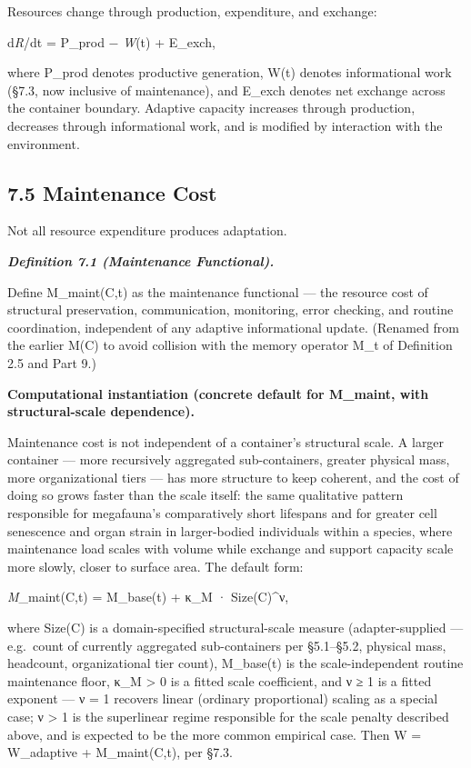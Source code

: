 \documentclass[
]{article}
\begin{document}
Resources change through production, expenditure, and exchange:

d\emph{R}/dt = P\_prod − \emph{W}(t) + E\_exch,

where P\_prod denotes productive generation, W(t) denotes informational
work (§7.3, now inclusive of maintenance), and E\_exch denotes net
exchange across the container boundary. Adaptive capacity increases
through production, decreases through informational work, and is
modified by interaction with the environment.

\hypertarget{maintenance-cost}{%
\subsection{7.5 Maintenance Cost}\label{maintenance-cost}}

Not all resource expenditure produces adaptation.

\emph{\textbf{Definition 7.1 (Maintenance Functional).}}

Define M\_maint(C,t) as the maintenance functional --- the resource cost
of structural preservation, communication, monitoring, error checking,
and routine coordination, independent of any adaptive informational
update. (Renamed from the earlier M(C) to avoid collision with the
memory operator M\_t of Definition 2.5 and Part 9.)

\textbf{Computational instantiation (concrete default for M\_maint, with
structural-scale dependence).}

Maintenance cost is not independent of a container's structural scale. A
larger container --- more recursively aggregated sub-containers, greater
physical mass, more organizational tiers --- has more structure to keep
coherent, and the cost of doing so grows faster than the scale itself:
the same qualitative pattern responsible for megafauna's comparatively
short lifespans and for greater cell senescence and organ strain in
larger-bodied individuals within a species, where maintenance load
scales with volume while exchange and support capacity scale more
slowly, closer to surface area. The default form:

\emph{M}\_maint(C,t) = M\_base(t) + κ\_M · Size(C)\^{}ν,

where Size(C) is a domain-specified structural-scale measure
(adapter-supplied --- e.g.~count of currently aggregated sub-containers
per §5.1--§5.2, physical mass, headcount, organizational tier count),
M\_base(t) is the scale-independent routine maintenance floor, κ\_M
\textgreater{} 0 is a fitted scale coefficient, and ν ≥ 1 is a fitted
exponent --- ν = 1 recovers linear (ordinary proportional) scaling as a
special case; ν \textgreater{} 1 is the superlinear regime responsible
for the scale penalty described above, and is expected to be the more
common empirical case. Then W = W\_adaptive + M\_maint(C,t), per §7.3.
\end{document}
